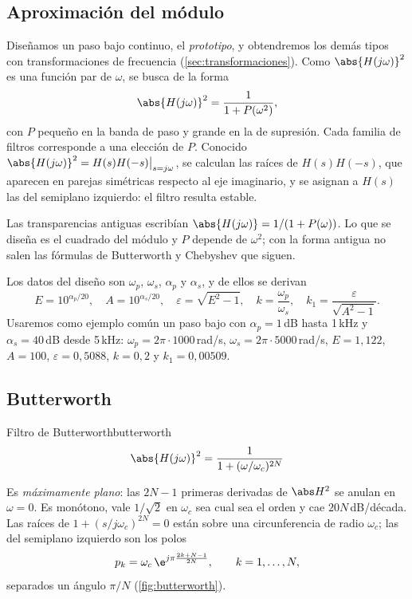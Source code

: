\documentclass[11pt,a4paper]{scrartcl}
\begin{document}
\subsection{Aproximación del módulo}

Diseñamos un paso bajo continuo, el \emph{prototipo}, y obtendremos los demás tipos con transformaciones de frecuencia (\cref{sec:transformaciones}). Como $\abs{H(j\omega)}^2$ es una función par de $\omega$, se busca de la forma
\[
  \abs{H(j\omega)}^2=\frac{1}{1+P(\omega^2)},
\]
con $P$ pequeño en la banda de paso y grande en la de supresión. Cada familia de filtros corresponde a una elección de $P$. Conocido $\abs{H(j\omega)}^2=H(s)H(-s)\big|_{s=j\omega}$, se calculan las raíces de $H(s)H(-s)$, que aparecen en parejas simétricas respecto al eje imaginario, y se asignan a $H(s)$ las del semiplano izquierdo: el filtro resulta estable.

\begin{errata}
  Las transparencias antiguas escribían $\abs{H(j\omega)}=1/(1+P(\omega))$. Lo que se diseña es el cuadrado del módulo y $P$ depende de $\omega^2$; con la forma antigua no salen las fórmulas de Butterworth y Chebyshev que siguen.
\end{errata}

Los datos del diseño son $\omega_p$, $\omega_s$, $\alpha_p$ y $\alpha_s$, y de ellos se derivan
\[
  E=10^{\alpha_p/20},\quad A=10^{\alpha_s/20},\quad \varepsilon=\sqrt{E^2-1},\quad k=\frac{\omega_p}{\omega_s},\quad k_1=\frac{\varepsilon}{\sqrt{A^2-1}}.
\]
Usaremos como ejemplo común un paso bajo con $\alpha_p=1$\,dB hasta 1\,kHz y $\alpha_s=40$\,dB desde 5\,kHz: $\omega_p=2\pi\cdot1000$\,rad/s, $\omega_s=2\pi\cdot5000$\,rad/s, $E=1{,}122$, $A=100$, $\varepsilon=0{,}5088$, $k=0{,}2$ y $k_1=0{,}00509$.

\subsection{Butterworth}

\begin{definicion}{Filtro de Butterworth}{butterworth}
  \[
    \abs{H(j\omega)}^2=\frac{1}{1+(\omega/\omega_c)^{2N}}
  \]
\end{definicion}

Es \emph{máximamente plano}: las $2N-1$ primeras derivadas de $\abs H^2$ se anulan en $\omega=0$. Es monótono, vale $1/\sqrt2$ en $\omega_c$ sea cual sea el orden y cae $20N$\,dB/década. Las raíces de $1+(s/j\omega_c)^{2N}=0$ están sobre una circunferencia de radio $\omega_c$; las del semiplano izquierdo son los polos
\[
  p_k=\omega_c\,\e^{j\pi\frac{2k+N-1}{2N}},\qquad k=1,\dots,N,
\]
separados un ángulo $\pi/N$ (\cref{fig:butterworth}).
\end{document}
